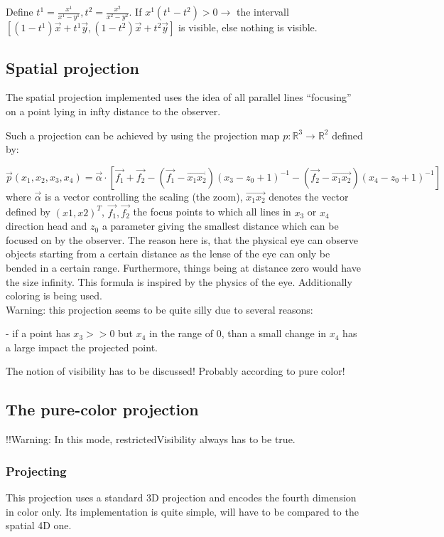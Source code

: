 \documentclass[titlepage]{scrartcl}
\begin{document}
Define $t^1 = \frac{x^1}{x^1 - y^1}, t^2 = \frac{x^2}{x^2 - y^2}$. If $x^1 (t^1 - t^2) > 0 \rightarrow $ the intervall $[(1 - t^1) \vec{x} + t^1 \vec{y}, (1 - t^2) \vec{x} + t^2 \vec{y}]$ is visible, else nothing is visible. 

\subsection{Spatial projection}
The spatial projection implemented uses the idea of all parallel lines \enquote{focusing} on a point lying in infty distance to the observer. 

Such a projection can be achieved by using the projection map $p : \mathbb{R}^3 \to \mathbb{R}^2$ defined by: 

\begin{equation}
\vec{p}(x_1, x_2, x_3, x_4) = \vec{\alpha} \cdot [\vec{f_1} + \vec{f_2} - (\vec{f_1} - \vec{x_1x_2}) (x_3 - z_0 + 1)^{-1} - (\vec{f_2} - \vec{x_1x_2}) (x_4 - z_0 + 1)^{-1}]
\end{equation}
where $\vec{\alpha}$ is a vector controlling the scaling (the zoom), $\vec{x_1 x_2}$ denotes the vector defined by $(x1, x2)^T$, $\vec{f_1}, \vec{f_2}$ the focus points to which all lines in $x_3$ or $x_4$ direction head and $z_0$ a parameter giving the smallest distance which can be focused on by the observer. 
The reason here is, that the physical eye can observe objects starting from a certain distance as the lense of the eye can only be bended in a certain range. Furthermore, things being at distance zero would have the size infinity. 
This formula is inspired by the physics of the eye. 
Additionally coloring is being used. \\

Warning: this projection seems to be quite silly due to several reasons: 

- if a point has $x_3 >> 0$ but $x_4$ in the range of 0, than a small change in $x_4$ has a large impact the projected point. 

The notion of visibility has to be discussed! Probably according to pure color!

\subsection{The pure-color projection}

!!Warning: In this mode, restrictedVisibility always has to be true. 

\subsubsection{Projecting}
This projection uses a standard 3D projection and encodes the fourth dimension in color only. Its implementation is quite simple, will have to be compared to the spatial 4D one. 
\end{document}
